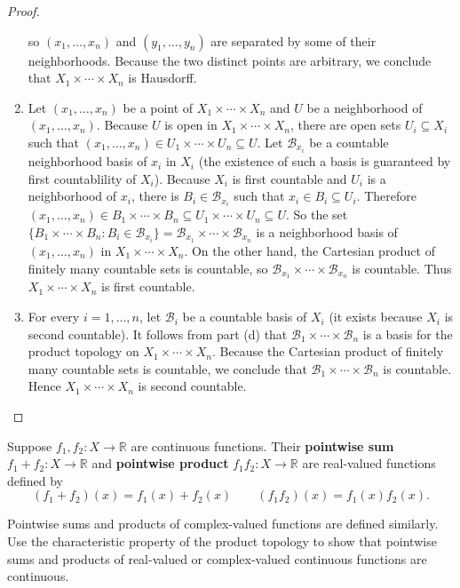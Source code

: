 \begin{proof}
\begin{enumerate}[label={(\alph*)}]
              so $(x_{1}, \ldots, x_{n})$ and $(y_{1}, \ldots, y_{n})$ are separated by some of their neighborhoods. Because the two distinct points are arbitrary, we conclude that $X_{1}\times\cdots\times X_{n}$ is Hausdorff.
        \item Let $(x_{1}, \ldots, x_{n})$ be a point of $X_{1}\times\cdots\times X_{n}$ and $U$ be a neighborhood of $(x_{1}, \ldots, x_{n})$. Because $U$ is open in $X_{1}\times\cdots\times X_{n}$, there are open sets $U_{i}\subseteq X_{i}$ such that $(x_{1}, \ldots, x_{n})\in U_{1}\times\cdots\times U_{n}\subseteq U$. Let $\mathscr{B}_{x_{i}}$ be a countable neighborhood basis of $x_{i}$ in $X_{i}$ (the existence of such a basis is guaranteed by first countablility of $X_{i}$). Because $X_{i}$ is first countable and $U_{i}$ is a neighborhood of $x_{i}$, there is $B_{i}\in \mathscr{B}_{x_{i}}$ such that $x_{i}\in B_{i}\subseteq U_{i}$. Therefore $(x_{1}, \ldots, x_{n})\in B_{1}\times\cdots\times B_{n}\subseteq U_{1}\times\cdots\times U_{n}\subseteq U$. So the set $\{ B_{1}\times\cdots\times B_{n}: B_{i}\in\mathscr{B}_{x_{i}} \} = \mathscr{B}_{x_{1}}\times\cdots\times\mathscr{B}_{x_{n}}$ is a neighborhood basis of $(x_{1}, \ldots, x_{n})$ in $X_{1}\times\cdots\times X_{n}$. On the other hand, the Cartesian product of finitely many countable sets is countable, so $\mathscr{B}_{x_{1}}\times\cdots\times\mathscr{B}_{x_{n}}$ is countable. Thus $X_{1}\times\cdots\times X_{n}$ is first countable.
        \item For every $i=1,\ldots,n$, let $\mathscr{B}_{i}$ be a countable basis of $X_{i}$ (it exists because $X_{i}$ is second countable). It follows from part (d) that $\mathscr{B}_{1}\times\cdots\times \mathscr{B}_{n}$ is a basis for the product topology on $X_{1}\times\cdots\times X_{n}$. Because the Cartesian product of finitely many countable sets is countable, we conclude that $\mathscr{B}_{1}\times\cdots\times \mathscr{B}_{n}$ is countable. Hence $X_{1}\times\cdots\times X_{n}$ is second countable.
    \end{enumerate}
\end{proof}

\begin{exercise}{3.34}
    Suppose $f_{1}, f_{2}: X\to \mathbb{R}$ are continuous functions. Their \textbf{pointwise sum} $f_{1} + f_{2}: X\to \mathbb{R}$ and \textbf{pointwise product} $f_{1}f_{2}: X\to \mathbb{R}$ are real-valued functions defined by
    \[
        (f_{1} + f_{2})(x) = f_{1}(x) + f_{2}(x)\qquad (f_{1}f_{2})(x) = f_{1}(x)f_{2}(x).
    \]

    Pointwise sums and products of complex-valued functions are defined similarly. Use the characteristic property of the product topology to show that pointwise sums and products of real-valued or complex-valued continuous functions are continuous.
\end{exercise}

